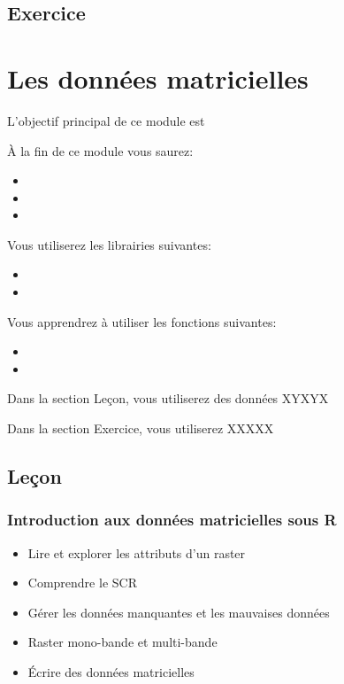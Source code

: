 \documentclass[
  12pt,
]{krantz}
\providecommand{\tightlist}{%
  \setlength{\itemsep}{0pt}\setlength{\parskip}{0pt}}
\begin{document}
\hypertarget{exercice-2}{%
\section{Exercice}\label{exercice-2}}

\hypertarget{mat}{%
\chapter{Les données matricielles}\label{mat}}

L'objectif principal de ce module est

À la fin de ce module vous saurez:

\begin{itemize}
\item
\item
\item
\end{itemize}

Vous utiliserez les librairies suivantes:

\begin{itemize}
\item
\item
\end{itemize}

Vous apprendrez à utiliser les fonctions suivantes:

\begin{itemize}
\item
\item
\end{itemize}

Dans la section Leçon, vous utiliserez des données XYXYX

Dans la section Exercice, vous utiliserez XXXXX

\hypertarget{leuxe7on-3}{%
\section{Leçon}\label{leuxe7on-3}}

\hypertarget{introduction-aux-donnuxe9es-matricielles-sous-r}{%
\subsection{Introduction aux données matricielles sous R}\label{introduction-aux-donnuxe9es-matricielles-sous-r}}

\begin{itemize}
\tightlist
\item
  Lire et explorer les attributs d'un raster
\item
  Comprendre le SCR
\item
  Gérer les données manquantes et les mauvaises données
\item
  Raster mono-bande et multi-bande
\item
  Écrire des données matricielles
\end{itemize}
\end{document}
